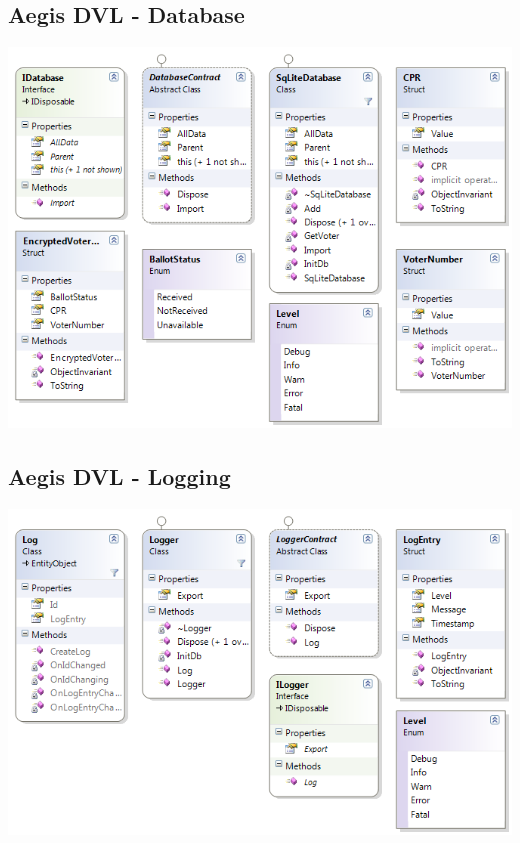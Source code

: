 \documentclass[a4paper]{report}
\begin{document}
\subsection*{ Aegis DVL - Database}
\begin{center}
\includegraphics[width=\textwidth]{DVLClassdiagram_Database.png}
\end{center}
\subsection*{ Aegis DVL - Logging}
\begin{center}
\includegraphics[width=\textwidth]{DVLClassdiagram_Logging.png}
\end{center}
\end{document}
